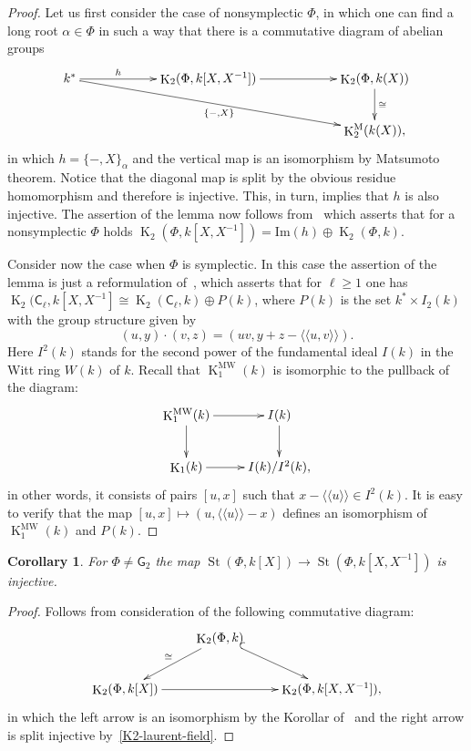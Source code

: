 \documentclass[oneside, 8pt]{amsart}
\newtheorem{corollary}[lemma]{Corollary}
\theoremstyle{remark}
\theoremstyle{definition}
\numberwithin{lemma}{section}
\numberwithin{prop}{section}
\numberwithin{corollary}{section}
\DeclareMathOperator{\St}{St}
\DeclareMathOperator{\K}{K}
\newcommand{\inv}{^{-1}}
\newcommand{\rC}{\mathsf{C}}
\newcommand{\rG}{\mathsf{G}}
\numberwithin{equation}{section}
\begin{document}
\begin{proof} Let us first consider the case of nonsymplectic $\Phi$, in which one can find a long root $\alpha\in \Phi$ in such a way that there is a commutative diagram of abelian groups
\[\xymatrixcolsep{5pc}\xymatrix{k^* \ar[r]^-{h} \ar[rrd]_{\{-, X\}} & \K_2(\Phi, k[X, X^{-1}]) \ar[r] & \K_2(\Phi, k(X)) \ar[d]^{\cong} \\
                                                                                      &                                 & \K_2^\mathrm{M}(k(X)),} \]
in which $h = \{ -, X \}_{\alpha}$ and the vertical map is an isomorphism by Matsumoto theorem.
Notice that the diagonal map is split by the obvious residue homomorphism and therefore is injective. This, in turn, implies that $h$ is also injective.
The assertion of the lemma now follows from~\cite[Satz~3]{Hur77} which asserts that for a nonsymplectic $\Phi$ holds $\K_2(\Phi, k[X, X\inv]) = \mathrm{Im}(h) \oplus \K_2(\Phi, k)$.

Consider now the case when $\Phi$ is symplectic. In this case the assertion of the lemma is just a reformulation of~\cite[Theorem~B]{MR91},
which asserts that for $\ell \geq 1$ one has $\K_2(\rC_\ell, k[X, X\inv] \cong \K_2(\rC_\ell, k) \oplus P(k)$, where
$P(k)$ is the set $k^* \times I_2(k)$ with the group structure given by
\[ (u, y) \cdot (v, z) = (uv, y + z - \langle\langle u, v\rangle\rangle).\]
Here $I^2(k)$ stands for the second power of the fundamental ideal $I(k)$ in the Witt ring $W(k)$ of $k$.
Recall that $\K_1^\mathrm{MW}(k)$ is isomorphic to the pullback of the diagram:
\[ \xymatrix{ \K_1^\mathrm{MW}(k) \ar[r] \ar[d] & I(k) \ar[d] \\ \K_1(k) \ar[r] & I(k)/I^2(k), } \]
in other words, it consists of pairs $[u, x]$ such that $x - \langle \langle u \rangle \rangle \in I^2(k)$.
It is easy to verify that the map $[u, x] \mapsto (u, \langle\langle u \rangle\rangle - x)$ defines an isomorphism of $\K_1^\mathrm{MW}(k)$ and $P(k)$. \end{proof}
 
\begin{corollary} \label{field-injectivity} For $\Phi\neq\rG_2$ the map $\St(\Phi, k[X]) \to \St(\Phi, k[X, X^{-1}])$ is injective. \end{corollary}
\begin{proof} Follows from consideration of the following commutative diagram:
\[\xymatrix{ & \K_2(\Phi, k) \ar[dl]_{\cong} \ar@{^{(}->}[dr] & \\
               \K_2(\Phi, k[X]) \ar[rr] &               & \K_2(\Phi, k[X, X^{-1}]),} \]
in which the left arrow is an isomorphism by the Korollar of~\cite[Satz~1]{Re75} and the right arrow is split injective by~\cref{K2-laurent-field}. \end{proof}
\end{document}
